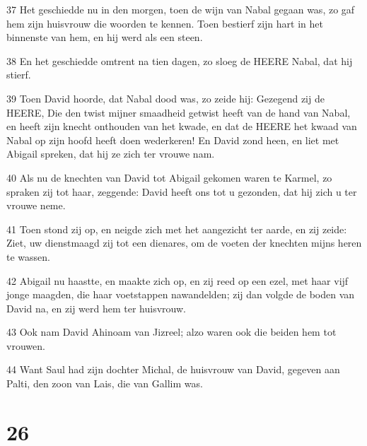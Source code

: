 \par 37 Het geschiedde nu in den morgen, toen de wijn van Nabal gegaan was, zo gaf hem zijn huisvrouw die woorden te kennen. Toen bestierf zijn hart in het binnenste van hem, en hij werd als een steen.
\par 38 En het geschiedde omtrent na tien dagen, zo sloeg de HEERE Nabal, dat hij stierf.
\par 39 Toen David hoorde, dat Nabal dood was, zo zeide hij: Gezegend zij de HEERE, Die den twist mijner smaadheid getwist heeft van de hand van Nabal, en heeft zijn knecht onthouden van het kwade, en dat de HEERE het kwaad van Nabal op zijn hoofd heeft doen wederkeren! En David zond heen, en liet met Abigail spreken, dat hij ze zich ter vrouwe nam.
\par 40 Als nu de knechten van David tot Abigail gekomen waren te Karmel, zo spraken zij tot haar, zeggende: David heeft ons tot u gezonden, dat hij zich u ter vrouwe neme.
\par 41 Toen stond zij op, en neigde zich met het aangezicht ter aarde, en zij zeide: Ziet, uw dienstmaagd zij tot een dienares, om de voeten der knechten mijns heren te wassen.
\par 42 Abigail nu haastte, en maakte zich op, en zij reed op een ezel, met haar vijf jonge maagden, die haar voetstappen nawandelden; zij dan volgde de boden van David na, en zij werd hem ter huisvrouw.
\par 43 Ook nam David Ahinoam van Jizreel; alzo waren ook die beiden hem tot vrouwen.
\par 44 Want Saul had zijn dochter Michal, de huisvrouw van David, gegeven aan Palti, den zoon van Lais, die van Gallim was.

\chapter{26}


